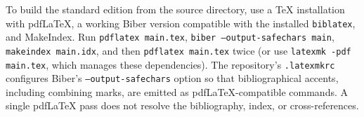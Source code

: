 \documentclass[../main]{subfiles}
\begin{document}
To build the standard edition from the source directory, use a TeX installation with pdfLaTeX, a working Biber version compatible with the installed \texttt{biblatex}, and MakeIndex. Run \texttt{pdflatex main.tex}, \texttt{biber --output-safechars main}, \texttt{makeindex main.idx}, and then \texttt{pdflatex main.tex} twice (or use \texttt{latexmk -pdf main.tex}, which manages these dependencies). The repository's \texttt{.latexmkrc} configures Biber's \texttt{--output-safechars} option so that bibliographical accents, including combining marks, are emitted as pdfLaTeX-compatible commands. A single pdfLaTeX pass does not resolve the bibliography, index, or cross-references.
\end{document}
